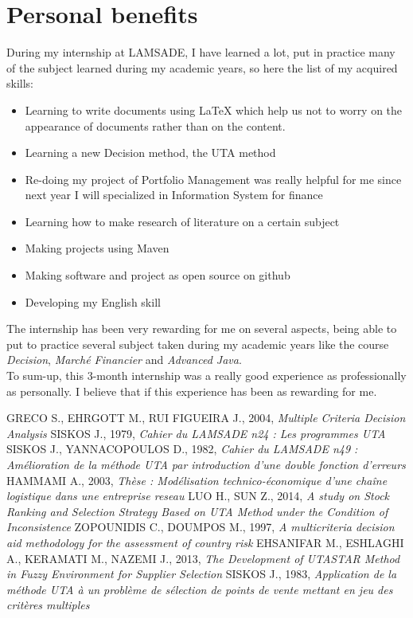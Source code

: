\documentclass{report}
\begin{document}
\section{Personal benefits}
During my internship at LAMSADE, I have learned a lot, put in practice many of the subject learned during my academic years, so here the list of my acquired skills: 
\begin{itemize}
\item Learning to write documents using LaTeX which help us not to worry on the appearance of documents rather than on the content. 
\item Learning a new Decision method, the UTA method
\item Re-doing my project of Portfolio Management was really helpful for me since next year I will specialized in Information System for finance
\item Learning how to make research of literature on a certain subject 
\item Making projects using Maven
\item Making software and project as open source on github
\item Developing my English skill
\end{itemize}

The internship has been very rewarding for me on several aspects, being able to put to practice several subject taken during my academic years like the course \textit{Decision}, \textit{Marché Financier} and \textit{Advanced Java}. \\
To sum-up, this 3-month internship was a really good experience as professionally as personally. I believe that if this experience has been as rewarding for me.

\begin{thebibliography}{9}
 GRECO S., EHRGOTT M., RUI FIGUEIRA J., 2004, \textit{Multiple Criteria Decision Analysis}
 SISKOS J., 1979, \textit{Cahier du LAMSADE n24 : Les programmes UTA}
 SISKOS J., YANNACOPOULOS D., 1982, \textit{Cahier du LAMSADE n49 : Amélioration de la méthode UTA par introduction d’une double fonction d’erreurs}
 HAMMAMI A., 2003, \textit{Thèse : Modélisation technico-économique d’une chaîne logistique dans une entreprise reseau}
 LUO H., SUN Z., 2014, \textit{A study on Stock Ranking and Selection Strategy Based on UTA Method under the Condition of Inconsistence}
 ZOPOUNIDIS C., DOUMPOS M., 1997, \textit{A multicriteria decision aid methodology for the assessment of country risk}
 EHSANIFAR M., ESHLAGHI A., KERAMATI M., NAZEMI J., 2013, \textit{The Development of UTASTAR Method in Fuzzy Environment for Supplier Selection}
 SISKOS J., 1983, \textit{Application de la méthode UTA à un problème de sélection de points de vente mettant en jeu des critères multiples}
\end{thebibliography}
\end{document}
